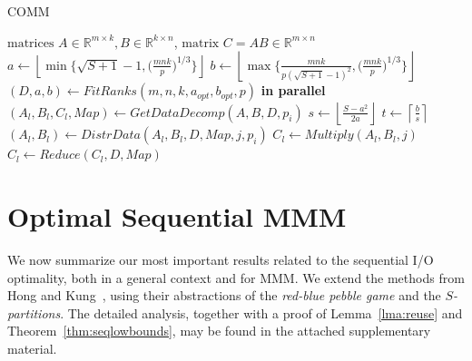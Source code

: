 \documentclass[sigplan,review,anonymous,10pt]{acmart}\settopmatter{printfolios=true,printccs=false,printacmref=false}
\begin{document}
\begin{algorithm}
	\small
\caption{COMM} \label{alg:comm}
\begin{algorithmic}[1]
\Require $\text{matrices } A \in \mathbb{R}^{m \times k}, B \in 
\mathbb{R}^{k \times n}$,
\Ensure $\text{matrix } C = AB \in \mathbb{R}^{m \times n}$
\State $a \gets \left \lfloor \min\Big\{\sqrt{S + 1} - 1, 
\Big(\frac{mnk}{p}\Big)^{1/3} \Big\} \right \rfloor$ 
\label{alg:line:aopt}
\State $b \gets \left \lfloor \max\Big\{\frac{mnk}{p(\sqrt{S + 1} - 1)^2}, 
\Big(\frac{mnk}{p}\Big)^{1/3} \Big\} \right \rfloor$ 
\label{alg:line:bopt}
\State $(D, a, b) \gets FitRanks(m,n,k,a_{opt},b_{opt},p)$ 
\label{alg:line:fitranks}
 \textbf{in parallel}
\label{alg:line:outerloopStart}
%
\State $(A_l, B_l, C_l,Map) \gets GetDataDecomp(A,B, D, p_i)$ 
\label{alg:line:datadecomp}
\State $s \gets \left \lfloor{\frac{S - a^2}{2a}}\right \rfloor$ 
\label{alg:line:stepsize}
\State $t \gets \left \lceil{\frac{b}{s}}\right \rceil$ 
\label{alg:line:steps}
\label{alg:line:innerloopStart}
\State $(A_l, B_l) \gets DistrData(A_l,B_l,D, Map, j, p_i)$ 
\label{alg:line:distrData}
\State $C_l \gets Multiply(A_l, B_l,j)$ 
\label{alg:line:compute}
\EndFor
\label{alg:line:innerLoopEnd}
\State $C_l \gets Reduce(C_l,D,  Map)$ 
\label{alg:line:reduce}
\EndFor
\label{alg:line:outerLoopEnd}
\end{algorithmic}
\end{algorithm}

\section{Optimal Sequential MMM}
\label{sec:seqScheduling}

We now summarize our most important results related to the sequential I/O
optimality, both in a general context and for MMM. We extend the methods from 
Hong and
Kung~\cite{redblue}, using their abstractions of the \emph{red-blue pebble game}
and the \emph{$S$-partitions}. The detailed analysis, together with a proof of
Lemma~\ref{lma:reuse} and Theorem~\ref{thm:seqlowbounds}, may be found in the
attached supplementary material.
\end{document}
